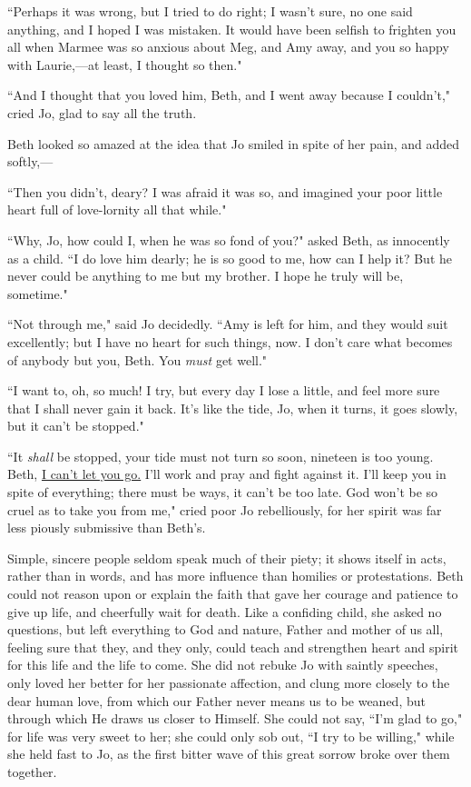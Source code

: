 ``Perhaps it was wrong, but I tried to do right; I wasn't
sure, no one said anything, and I hoped I was mistaken. It would have
been selfish to frighten you all when Marmee was so anxious about Meg,
and Amy away, and you so happy with Laurie,---at least, I thought so
then."

``And I thought that you loved him, Beth, and I went away because I
couldn't," cried Jo, glad to say all the truth.

Beth looked so amazed at the idea that Jo smiled in spite of her pain,
and added softly,---

``Then you didn't, deary? I was afraid it was so, and
imagined your poor little heart full of love-lornity all that while."

``Why, Jo, how could I, when he was so fond of you?" asked Beth, as
innocently as a child. ``I do love him dearly; he is so good to me, how
can I help it? But he never could be anything to me but my brother. I
hope he truly will be, sometime."

``Not through me," said Jo decidedly. ``Amy is left for him, and they
would suit excellently; but I have no heart for such things, now. I
don't care what becomes of anybody but you, Beth. You
\emph{must} get well."

``I want to, oh, so much! I try, but every day I lose a little, and feel
more sure that I shall never gain it back. It's like the
tide, Jo, when it turns, it goes slowly, but it can't be
stopped."

``It \emph{shall} be stopped, your tide must not turn so soon, nineteen
is too young. Beth, \underline{I can't let you go.}
I'll work and pray and fight against it.
I'll keep you in spite of everything; there must be
ways, it can't be too late. God won't be
so cruel as to take you from me," cried poor Jo rebelliously, for her
spirit was far less piously submissive than Beth's.

Simple, sincere people seldom speak much of their piety; it shows itself
in acts, rather than in words, and has more influence than homilies or
protestations. Beth could not reason upon or explain the faith that gave
her courage and patience to give up life, and cheerfully wait for death.
Like a confiding child, she asked no questions, but left everything to
God and nature, Father and mother of us all, feeling sure that they, and
they only, could teach and strengthen heart and spirit for this life and
the life to come. She did not rebuke Jo with saintly speeches, only
loved her better for her passionate affection, and clung more closely to
the dear human love, from which our Father never means us to be weaned,
but through which He draws us closer to Himself. She could not say,
``I'm glad to go," for life was very sweet to her; she
could only sob out, ``I try to be willing," while she held fast to Jo, as
the first bitter wave of this great sorrow broke over them together.

